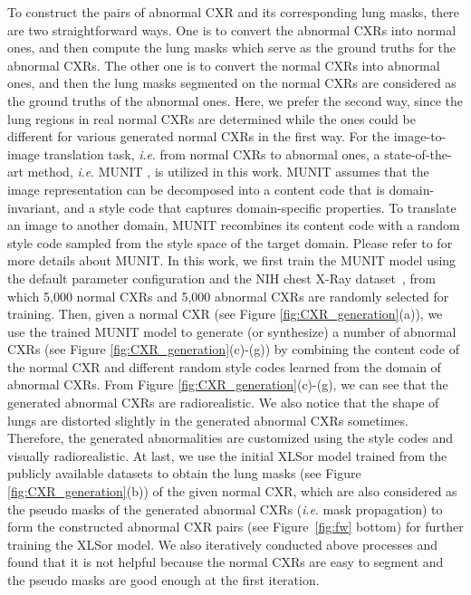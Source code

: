 \documentclass{midl} \usepackage{multirow}
\newcommand{\ie}{\textit{i}.\textit{e}. }
\begin{document}
To construct the pairs of abnormal CXR and its corresponding lung masks, there are two straightforward ways. One is to convert the abnormal CXRs into normal ones, and then compute the lung masks which serve as the ground truths for the abnormal CXRs. The other one is to convert the normal CXRs into abnormal ones, and then the lung masks segmented on the normal CXRs are considered as the ground truths of the abnormal ones. Here, we prefer the second way, since the lung regions in real normal CXRs are determined while the ones could be different for various generated normal CXRs in the first way. For the image-to-image translation task, \ie from normal CXRs to abnormal ones, a state-of-the-art method, \ie MUNIT \cite{munit}, is utilized in this work. MUNIT assumes that the image representation can be decomposed into a content code that is domain-invariant, and a style code that captures domain-specific properties. To translate an image to another domain, MUNIT recombines its content code with a random style code sampled from the style space of the target domain. Please refer to \cite{munit} for more details about MUNIT. In this work, we first train the MUNIT model using the default parameter configuration and the NIH chest X-Ray dataset~\cite{Wang_cvpr17}, from which 5,000 normal CXRs and 5,000 abnormal CXRs are randomly selected for training. Then, given a normal CXR (see Figure \ref{fig:CXR_generation}(a)), we use the trained MUNIT model to generate (or synthesize) a number of abnormal CXRs (see Figure \ref{fig:CXR_generation}(c)-(g)) by combining the content code of the normal CXR and different random style codes learned from the domain of abnormal CXRs. From Figure \ref{fig:CXR_generation}(c)-(g), we can see that the generated abnormal CXRs are radiorealistic. We also notice that the shape of lungs are distorted slightly in the generated abnormal CXRs sometimes. Therefore, the generated abnormalities are customized using the style codes and visually radiorealistic. At last, we use the initial XLSor model trained from the publicly available datasets to obtain the lung masks (see Figure \ref{fig:CXR_generation}(b)) of the given normal CXR, which are also considered as the pseudo masks of the generated abnormal CXRs (\ie mask propagation) to form the constructed abnormal CXR pairs (see Figure~\ref{fig:fw} bottom) for further training the XLSor model. We also iteratively conducted above processes and found that it is not helpful because the normal CXRs are easy to segment and the pseudo masks are good enough at the first iteration.
\end{document}
